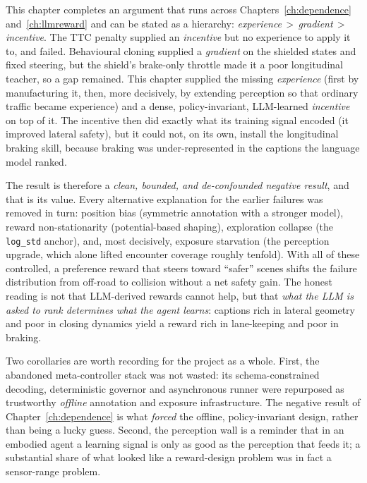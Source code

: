 This chapter completes an argument that runs across Chapters~\ref{ch:dependence}
and~\ref{ch:llmreward} and can be stated as a hierarchy: \emph{experience\,$>$\,gradient\,$>$\,
incentive}. The TTC penalty supplied an \emph{incentive} but no experience to apply it to, and
failed. Behavioural cloning supplied a \emph{gradient} on the shielded states and fixed steering,
but the shield's brake-only throttle made it a poor longitudinal teacher, so a gap remained. This
chapter supplied the missing \emph{experience} (first by manufacturing it, then, more decisively,
by extending perception so that ordinary traffic became experience) and a dense, policy-invariant,
LLM-learned \emph{incentive} on top of it. The incentive then did exactly what its training
signal encoded (it improved lateral safety), but it could not, on its own, install the
longitudinal braking skill, because braking was under-represented in the captions the language
model ranked.

The result is therefore a \emph{clean, bounded, and de-confounded negative result}, and that is
its value. Every alternative explanation for the earlier failures was removed in turn: position
bias (symmetric annotation with a stronger model), reward non-stationarity (potential-based
shaping), exploration collapse (the \texttt{log\_std} anchor), and, most decisively, exposure
starvation (the perception upgrade, which alone lifted encounter coverage roughly tenfold). With
all of these controlled, a preference reward that steers toward ``safer'' scenes shifts the failure
distribution from off-road to collision without a net safety gain. The honest reading is not that
LLM-derived rewards cannot help, but that \emph{what the LLM is asked to rank determines what
the agent learns}: captions rich in lateral geometry and poor in closing dynamics yield a reward
rich in lane-keeping and poor in braking.

Two corollaries are worth recording for the project as a whole. First, the abandoned
meta-controller stack was not wasted: its schema-constrained decoding, deterministic governor and
asynchronous runner were repurposed as trustworthy \emph{offline} annotation and exposure
infrastructure. The negative result of Chapter~\ref{ch:dependence} is what \emph{forced} the
offline, policy-invariant design, rather than being a lucky guess. Second, the perception wall
is a reminder that in an embodied agent a learning signal is only as good as the perception that
feeds it; a substantial share of what looked like a reward-design problem was in fact a
sensor-range problem.

